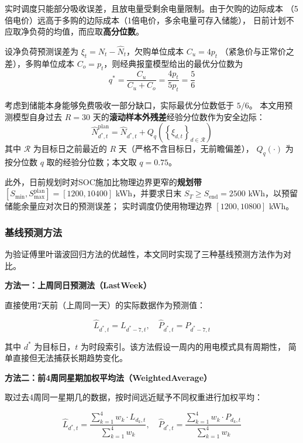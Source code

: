 \documentclass[12pt,a4paper]{article}
\begin{document}
实时调度只能部分吸收误差，且放电量受剩余电量限制。由于欠购的边际成本
（5倍电价）远高于多购的边际成本（1倍电价，多余电量可存入储能），
日前计划不应取净负荷的均值，而应取\textbf{高分位数}。

设净负荷预测误差为 $\xi_t = N_t - \hat{N}_t$，欠购单位成本 $C_u = 4p_t$
（紧急价与正常价之差），多购单位成本 $C_o = p_t$，则经典报童模型给出的最优分位数为
\begin{equation}
    q^* = \frac{C_u}{C_u + C_o} = \frac{4p_t}{5p_t} = \frac{5}{6}
\end{equation}

考虑到储能本身能够免费吸收一部分缺口，实际最优分位数低于 $5/6$。
本文用预测模型自身过去 $R=30$ 天的\textbf{滚动样本外残差}经验分位数作为安全边际：
\begin{equation}
    \hat{N}_{d^*,t}^{\text{plan}} = \hat{N}_{d^*,t}
        + Q_q\left(\left\{\xi_{d,t}\right\}_{d \in \mathcal{R}}\right)
\end{equation}
其中 $\mathcal{R}$ 为目标日之前最近的 $R$ 天（严格不含目标日，无前瞻偏差），
$Q_q(\cdot)$ 为按分位数 $q$ 取的经验分位数；本文取 $q = 0.75$。

此外，日前规划时对SOC施加比物理边界更窄的\textbf{规划带}
$[S_{\min}, S_{\max}^{\text{plan}}] = [1200, 10400]$ kWh，并要求日末
$S_T \geq S_{\text{end}} = 2500$ kWh，以预留储能余量应对次日的预测误差；
实时调度仍使用物理边界 $[1200, 10800]$ kWh。

\subsubsection{基线预测方法}

为验证傅里叶谐波回归方法的优越性，本文同时实现了三种基线预测方法作为对比。

\textbf{方法一：上周同日预测法（LastWeek）}

直接使用7天前（上周同一天）的实际数据作为预测值：

\begin{equation}
    \hat{L}_{d^*,t} = L_{d^*-7,t}, \quad \hat{P}_{d^*,t} = P_{d^*-7,t}
\end{equation}

其中 $d^*$ 为目标日，$t$ 为时段索引。该方法假设一周内的用电模式具有周期性，
简单直接但无法捕获长期趋势变化。

\textbf{方法二：前4周同星期加权平均法（WeightedAverage）}

取过去4周同一星期几的数据，按时间远近赋予不同权重进行加权平均：

\begin{equation}
    \hat{L}_{d^*,t} = \frac{\sum_{k=1}^{4} w_k \cdot L_{d_k,t}}{\sum_{k=1}^{4} w_k}, \quad
    \hat{P}_{d^*,t} = \frac{\sum_{k=1}^{4} w_k \cdot P_{d_k,t}}{\sum_{k=1}^{4} w_k}
\end{equation}
\end{document}
